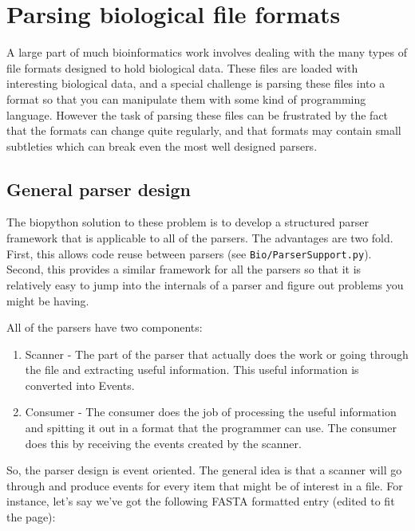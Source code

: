 \documentclass{report}
\begin{document}
\section{Parsing biological file formats}

A large part of much bioinformatics work involves dealing with the many types of file formats designed to hold biological data. These files are loaded with interesting biological data, and a special challenge is parsing these files into a format so that you can manipulate them with some kind of programming language. However the task of parsing these files can be frustrated by the fact that the formats can change quite regularly, and that formats may contain small subtleties which can break even the most well designed parsers. 

\subsection{General parser design}

The biopython solution to these problem is to develop a structured parser framework that is applicable to all of the parsers. The advantages are two fold. First, this allows code reuse between parsers (see \verb|Bio/ParserSupport.py|). Second, this provides a similar framework for all the parsers so that it is relatively easy to jump into the internals of a parser and figure out problems you might be having. 


All of the parsers have two components:

\begin{enumerate}

\item Scanner - The part of the parser that actually does the work or going through the file and extracting useful information. This useful information is converted into Events.

\item Consumer - The consumer does the job of processing the useful information and spitting it out in a format that the programmer can use. The consumer does this by receiving the events created by the scanner.

\end{enumerate}

So, the parser design is event oriented. The general idea is that a scanner will go through and produce events for every item that might be of interest in a file. For instance, let's say we've got the following FASTA formatted entry (edited to fit the page):
\end{document}
